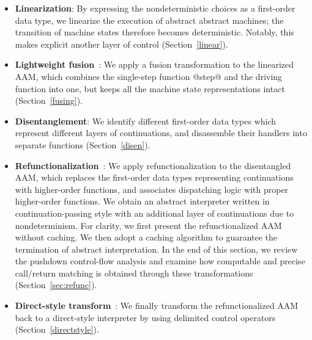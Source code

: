 \documentclass[acmsmall, review]{acmart}\settopmatter{}
\begin{document}
\begin{itemize}
  \item \textbf{Linearization}: By expressing the
    nondeterministic choices as a first-order data type, we linearize the execution
    of abstract abstract machines; the transition of machine states therefore becomes
    deterministic. Notably, this makes explicit another layer of control (Section~\ref{linear}). 

  \item \textbf{Lightweight fusion}~\cite{DANVY2008100,Ohori:2007:LFF:1190216.1190241}:
    We apply a fusion transformation to the linearized AAM, which
    combines the single-step function @step@ and the 
    driving function into one, but keeps all the machine state representations intact
    (Section~\ref{fusing}).

  \item \textbf{Disentanglement}: We identify 
    different first-order data types which represent different layers of continuations, and
    disassemble their handlers into separate functions 
    (Section~\ref{disen}).

  \item \textbf{Refunctionalization}~\cite{DANVY2009534,Danvy:2006:RW:2171265.2171268}:
    We apply refunctionalization to the disentangled AAM, which
    replaces the first-order data types representing continuations with
    higher-order functions, and associates dispatching logic with proper higher-order functions. 
    We obtain an abstract interpreter written in continuation-passing style with an
    additional layer of continuations due to nondeterminism.
%
    For clarity, we first present the refunctionalized AAM without caching. 
    We then adopt a caching algorithm \cite{darais2017abstracting} to guarantee the termination 
    of abstract interpretation.
    In the end of this section, we review the pushdown control-flow analysis and examine how 
    computable and precise call/return matching is obtained through these transformations
    (Section~\ref{sec:refunc}).

  \item \textbf{Direct-style transform}~\cite{DBLP:journals/scp/Danvy94}:
    We finally transform the refunctionalized AAM back to a
    direct-style interpreter by using delimited control operators
    (Section~\ref{directstyle}).
\end{itemize}
\end{document}
